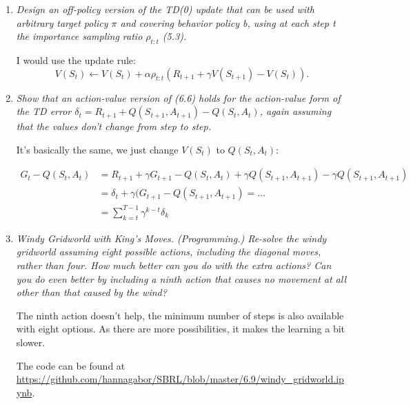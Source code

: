 \documentclass[12pt,a4paper]{article}
\begin{document}
\begin{enumerate}
\item
\textit{Design an off-policy version of the TD(0) update that can be used with
arbitrary target policy $\pi$ and covering behavior policy b, using at each step t the importance
sampling ratio $\rho_{t:t}$ (5.3).}

I would use the update rule:
\[V(S_t) \leftarrow V(S_t) + \alpha \rho_{t:t} (R_{t + 1} + \gamma V(S_{t + 1}) - V(S_t)).\]

\item
\textit{Show that an action-value version of (6.6) holds for the action-value form
of the TD error $\delta_t = R_{t+1} + Q(S_{t+1}, A_{t+1}) - Q(S_t, A_t)$, again
assuming that the values don’t change from step to step.}

It's basically the same, we just change $V(S_t)$ to $Q(S_t, A_t)$:

\begin{align*}
  G_t - Q(S_t, A_t) &= R_{t + 1} + \gamma G_{t + 1} - Q(S_t, A_t)
  + \gamma Q(S_{t + 1}, A_{t + 1}) - \gamma Q(S_{t + 1}, A_{t + 1})\\
  &= \delta_t + \gamma (G_{t + 1} - Q(S_{t + 1}, A_{t + 1}) = \dots \\
  &= \sum\limits_{k = t}^{T - 1} \gamma^{k - t} \delta_k
\end{align*}

\item
\textit{Windy Gridworld with King’s Moves. (Programming.) Re-solve the windy
gridworld assuming eight possible actions, including the diagonal moves, rather than four.
How much better can you do with the extra actions? Can you do even better by including
a ninth action that causes no movement at all other than that caused by the wind?}

The ninth action doesn't help, the minimum number of steps is also available with
eight options. As there are more possibilities, it makes the learning a bit slower.

The code can be found at \url{https://github.com/hannagabor/SBRL/blob/master/6.9/windy_gridworld.ipynb}.


\end{enumerate}
\end{document}

